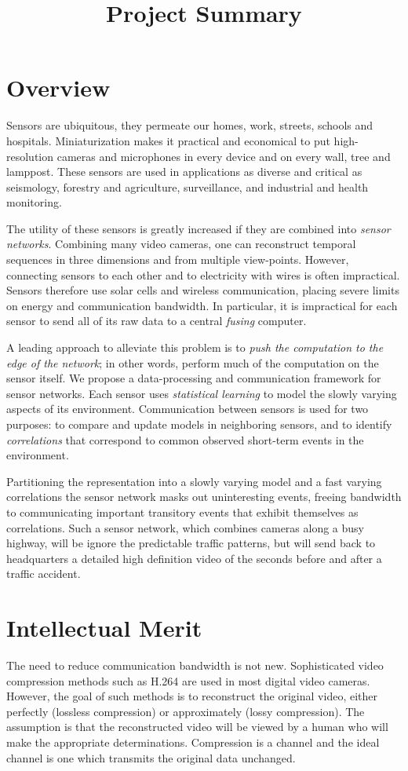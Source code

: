 \documentclass{article}
\title{Project Summary}
\begin{document}
\section{Overview}
Sensors are ubiquitous, they permeate our homes, work, streets, schools and hospitals.
Miniaturization makes it practical and economical to put high-resolution cameras and microphones in every device and on every wall, tree and lamppost. These sensors are used in applications as diverse and critical as seismology, forestry and agriculture, surveillance, and industrial and health monitoring. 

The utility of these sensors is greatly increased if they are combined into {\em sensor networks}. Combining many
video cameras, one can reconstruct temporal sequences in three dimensions and from multiple view-points. However, connecting sensors to each other and to electricity with wires is often impractical. Sensors therefore use solar cells and wireless communication, placing severe limits on energy and communication bandwidth. In particular, it is impractical for each sensor to send all of its raw data to a central {\em fusing} computer.  

A leading approach to alleviate this problem is to {\em push the computation to the edge of the network}; in other words, perform much of the computation on the sensor itself. We propose 
a data-processing and communication framework for sensor networks. Each sensor uses {\em
  statistical learning} to model the slowly varying aspects of its environment. Communication between sensors is used for two purposes: 
  to compare and update models in neighboring sensors, and to identify {\em correlations} that correspond to common observed short-term events in the environment.

Partitioning the representation into a slowly varying model and a fast varying correlations the sensor network masks out uninteresting events, freeing bandwidth to communicating important transitory events that exhibit themselves as correlations. Such a sensor network, which combines cameras along a busy highway, will be ignore the predictable traffic patterns, but will send back to headquarters a detailed high definition video of the seconds before and after a traffic accident.

\section{Intellectual Merit}
The need to reduce communication bandwidth is not new. Sophisticated video compression methods such as H.264 are used in most digital video cameras. However, the goal of such methods is to reconstruct the original video, either perfectly (lossless compression) or approximately (lossy compression). The assumption is that the reconstructed video will be viewed by a human who will make the appropriate determinations. Compression is a channel and the ideal channel is one which transmits the original data unchanged.
\end{document}
